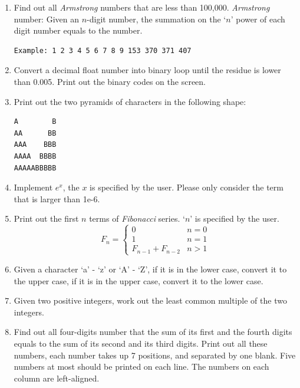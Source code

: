 \documentclass[11pt]{article}
\begin{document}
\begin{enumerate}
    \item Find out all \textit{Armstrong} numbers that are less than 100,000. \textit{Armstrong} number: Given an $n$-digit number, the summation on the `$n$' power of each digit number equals to the number. 
\\
\begin{lstlisting}
Example: 1 2 3 4 5 6 7 8 9 153 370 371 407
\end{lstlisting}
    
    
    \item Convert a decimal float number into binary loop until the residue is lower than 0.005. Print out the binary codes on the screen.
    
    \item Print out the two pyramids of characters in the following shape:
\\
\begin{lstlisting}
A        B
AA      BB
AAA    BBB
AAAA  BBBB
AAAAABBBBB
\end{lstlisting}
    
    \item Implement $e^x$, the $x$ is specified by the user. Please only consider the term that is larger than 1e-6.
    
    \item Print out the first $n$ terms of \textit{Fibonacci} series. `$n$' is specified by the user.
    \begin{equation}
F_n = 
\begin{cases} 
0 & n = 0 \\
1 & n = 1 \\
F_{n-1} + F_{n-2} & n > 1 
\end{cases}
\end{equation}

    \item Given a character `a' - `z' or `A' - `Z', if it is in the lower case, convert it to the upper case, if it is in the upper case, convert it to the lower case.
    
    \item Given two positive integers, work out the least common multiple of the two integers.
    
    \item Find out all four-digits number that the sum of its first and the fourth digits equals to the sum of its second and its third digits. Print out all these numbers, each number takes up 7 positions, and separated by one blank. Five numbers at most should be printed on each line. The numbers on each column are left-aligned.
    

\end{enumerate}
\end{document}
